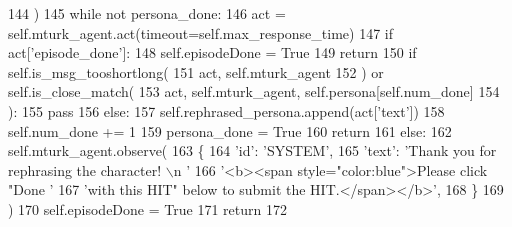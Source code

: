 \begin{DoxyCode}
144             )
145             \textcolor{keywordflow}{while} \textcolor{keywordflow}{not} persona\_done:
146                 act = self.mturk\_agent.act(timeout=self.max\_response\_time)
147                 \textcolor{keywordflow}{if} act[\textcolor{stringliteral}{'episode\_done'}]:
148                     self.episodeDone = \textcolor{keyword}{True}
149                     \textcolor{keywordflow}{return}
150                 \textcolor{keywordflow}{if} self.is\_msg\_tooshortlong(
151                     act, self.mturk\_agent
152                 ) \textcolor{keywordflow}{or} self.is\_close\_match(
153                     act, self.mturk\_agent, self.persona[self.num\_done]
154                 ):
155                     \textcolor{keywordflow}{pass}
156                 \textcolor{keywordflow}{else}:
157                     self.rephrased\_persona.append(act[\textcolor{stringliteral}{'text'}])
158                     self.num\_done += 1
159                     persona\_done = \textcolor{keyword}{True}
160             \textcolor{keywordflow}{return}
161         \textcolor{keywordflow}{else}:
162             self.mturk\_agent.observe(
163                 \{
164                     \textcolor{stringliteral}{'id'}: \textcolor{stringliteral}{'SYSTEM'},
165                     \textcolor{stringliteral}{'text'}: \textcolor{stringliteral}{'Thank you for rephrasing the character! \(\backslash\)n '}
166                     \textcolor{stringliteral}{'<b><span style="color:blue">Please click "Done '}
167                     \textcolor{stringliteral}{'with this HIT" below to submit the HIT.</span></b>'},
168                 \}
169             )
170             self.episodeDone = \textcolor{keyword}{True}
171             \textcolor{keywordflow}{return}
172 
\end{DoxyCode}
\mbox{\label{classparlai_1_1mturk_1_1tasks_1_1personachat_1_1personachat__rephrase_1_1worlds_1_1RephrasePersonaWorld_a800d5049a7b9ea6bd7759e57771da0f7}} 
